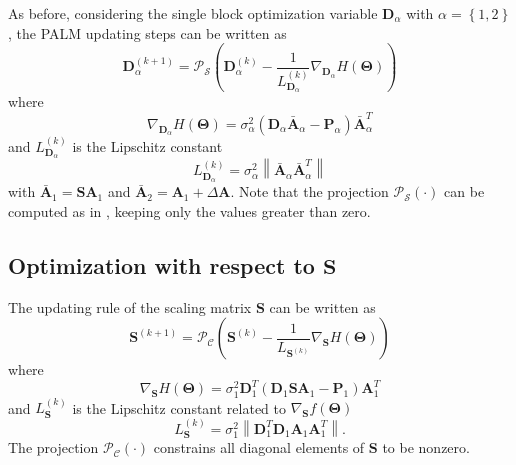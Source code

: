 \documentclass[review]{elsarticle}
\begin{document}
As before, considering the single block optimization variable $\mathbf{D}_{\alpha}$ with $\alpha = \left\{1,2\right\}$, the PALM updating steps can be written as
%
\begin{equation}
	\label{eq:dictionary_Update}
		\mathbf{D}_{\alpha}^{(k+1)} = \mathcal{P}_{\mathcal{S}}\left(\mathbf{D}_{\alpha}^{(k)} - \frac{1}{L_{\mathbf{D}_{\alpha}}^{(k)} }\nabla_{\mathbf{D}_{\alpha}} H(\boldsymbol{\Theta}) \right)
\end{equation}
where
\begin{equation}
		\nabla_{\mathbf{D}_{\alpha}} H(\boldsymbol{\Theta}) = \sigma^2_{\alpha}\left( \mathbf{D}_{\alpha}\bar{\mathbf{A}}_{\alpha} -\mathbf{P}_{\alpha}\right)\bar{\mathbf{A}}_{\alpha}^{T}
        \label{eq:nabla_dict}
\end{equation}
and
$L_{\mathbf{D}_{\alpha}}^{(k)} $ is the Lipschitz constant
%
\begin{equation}
		L_{\mathbf{D}_{\alpha}}^{(k)} = \sigma_{\alpha}^{2}\left\|\bar{\mathbf{A}}_{\alpha}\bar{\mathbf{A}}_{\alpha}^{T}\right\|
        \label{eq:lip_dict}
\end{equation}
%
with $\bar{\mathbf{A}}_{1} = \mathbf{S}\mathbf{A}_{1}$ and $\bar{\mathbf{A}}_{2} = \mathbf{A}_{1} + \Delta\mathbf{A}$. Note that the projection $\mathcal{P}_{\mathcal{S}}(\cdot)$ can be computed as in \citet{mairal_online_2009}, keeping only the values greater than zero.

\subsection{Optimization with respect to \texorpdfstring{$\mathbf{S}$}{S}}
The updating rule of the scaling matrix $\mathbf{S}$ can be written as
%
\begin{equation}
		\mathbf{S}^{(k+1)} = \mathcal{P}_{\mathcal{C}}\left(\mathbf{S}^{(k)} - \frac{1}{L_{\mathbf{S}^{(k)}}}\nabla_{\mathbf{S}} H(\boldsymbol{\Theta}) \right)
        \label{eq:scale_Update}
\end{equation}
where
\begin{equation}
		\nabla_{\mathbf{S}}H(\boldsymbol{\Theta}) = \sigma_{1}^2\mathbf{D}_{1}^{T}\left( \mathbf{D}_{1}\mathbf{S}\mathbf{A}_{1} - \mathbf{P}_{1}\right)\mathbf{A}_{1}^{T}
        \label{eq:nabla_scale}
\end{equation}
and $L_{\mathbf{S}}^{(k)}$ is the Lipschitz constant related to $\nabla_{\mathbf{S}}f(\boldsymbol{\Theta})$
\begin{equation}
		L_{\mathbf{S}}^{(k)} = \sigma_{1}^2\left\|\mathbf{D}_{1}^{T}\mathbf{D}_{1}\mathbf{A}_{1}\mathbf{A}_{1}^{T}\right\|.
        \label{eq:lip_scale}
\end{equation}
%
The projection $\mathcal{P}_{\mathcal{C}}(\cdot)$ constrains all diagonal elements of $\mathbf{S}$ to be nonzero.
\end{document}
